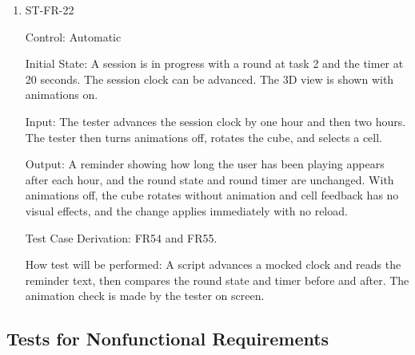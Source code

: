 \documentclass[12pt, titlepage]{article}
\renewcommand{\wss}[1]{}
\begin{document}
\begin{enumerate}

\item{ST-FR-22\\}

Control: Automatic

Initial State: A session is in progress with a round at task 2 and the timer at 20 seconds. The session clock can be advanced. The 3D view is shown with animations on.

Input: The tester advances the session clock by one hour and then two hours. The tester then turns animations off, rotates the cube, and selects a cell.

Output: A reminder showing how long the user has been playing appears after each hour, and the round state and round timer are unchanged. With animations off, the cube rotates without animation and cell feedback has no visual effects, and the change applies immediately with no reload.

Test Case Derivation: FR54 and FR55.

How test will be performed: A script advances a mocked clock and reads the reminder text, then compares the round state and timer before and after. The animation check is made by the tester on screen.

\end{enumerate}

\subsection{Tests for Nonfunctional Requirements}




\end{document}

